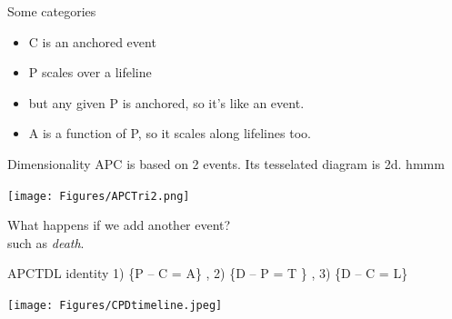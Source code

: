 \documentclass[20pt]{beamer}
\begin{document}

\begin{frame}[plain]
\begin{center}
\Large Some categories
\begin{itemize}[<+->]
  \item C is an anchored event
  \item P scales over a lifeline
  \item but any given P is anchored, so it's like an event.
  \item A is a function of P, so it scales along lifelines too.
\end{itemize}
\end{center}
\end{frame}


\begin{frame}[plain]
\begin{block}{Dimensionality}
APC is based on 2 events. Its tesselated diagram is 2d. hmmm
\end{block}
\begin{center}
\texttt{[image: Figures/APCTri2.png]}
\end{center}
\end{frame}


\begin{frame}[plain]
\begin{center}
\Large What happens if we add another event?\\ \vspace{1em}
such as \emph{death}.
\end{center}
\end{frame}


\begin{frame}[plain]
\begin{block}{APCTDL identity}
1) \{P -- C = A\}  ,  2) \{D -- P = T  \} , 3) \{D -- C = L\}
\end{block}
\begin{center}
\texttt{[image: Figures/CPDtimeline.jpeg]}
\end{center}
\end{frame}


\begin{frame}[plain]
\begin{center}
\end{center}
\end{frame}
\end{document}
